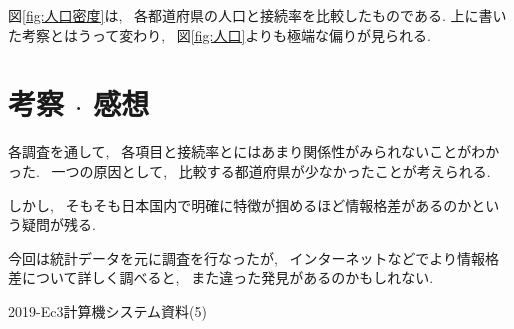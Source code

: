 \documentclass{jsarticle}
\begin{document}
        図\ref{fig:人口密度}は, ~各都道府県の人口と接続率を比較したものである.
        上に書いた考察とはうって変わり,
        ~図\ref{fig:人口}よりも極端な偏りが見られる.

\section{考察 $\cdot$ 感想}
    各調査を通して, ~各項目と接続率とにはあまり関係性がみられないことがわかった.
    ~一つの原因として, ~比較する都道府県が少なかったことが考えられる.

    しかし, ~そもそも日本国内で明確に特徴が掴めるほど情報格差があるのかという疑問が残る.

    今回は統計データを元に調査を行なったが,
    ~インターネットなどでより情報格差について詳しく調べると,
    ~また違った発見があるのかもしれない.

\begin{thebibliography}{}
     2019-Ec3計算機システム資料(5)
\end{thebibliography}
\end{document}
